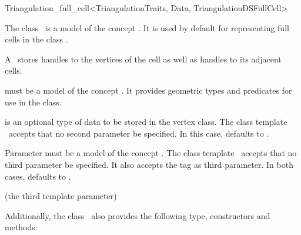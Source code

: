 \begin{ccRefClass}{Triangulation_full_cell<TriangulationTraits, Data, TriangulationDSFullCell>}

\ccDefinition

The class \ccRefName\ is a model of the concept . It
is used by default for representing full cells in the class
.

A \ccRefName\ stores handles to the vertices of the cell as well as handles
to its adjacent cells.


\ccParameters

 must be a model of the concept . It
provides geometric types and predicates for use in the
 class.

 is an optional type of data to be stored in the vertex class. The
class template \ccRefName\ accepts that no second parameter be specified. In
this case,  defaults to .

Parameter  must be a model of the concept
.
The class template \ccRefName\ accepts that no third parameter be specified.
It also accepts the tag  as third parameter. In both
cases,  defaults to .

\ccInheritsFrom

 (the third template parameter)

\ccIsModel


Additionally, the class \ccRefName\ also provides the following type,
constructors and methods:

\ccTypes


\ccCreation
{}



\end{ccRefClass}
